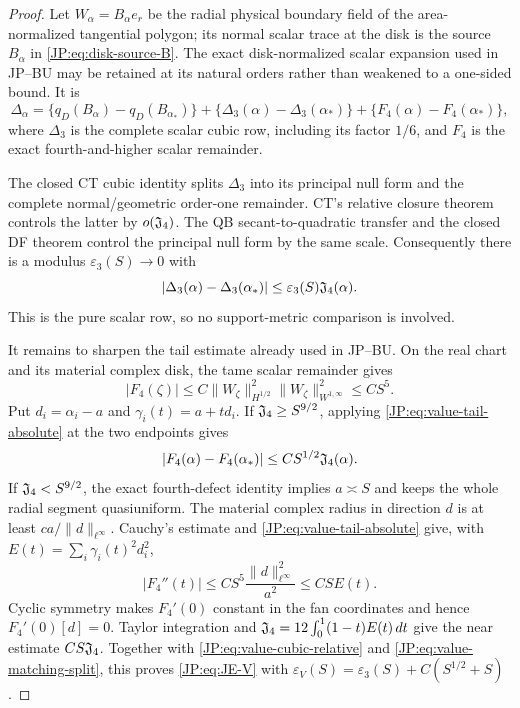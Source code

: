 \begin{proof}
Let $W_\alpha=B_\alpha e_r$ be the radial physical boundary field of the
area-normalized tangential polygon; its normal scalar trace at the disk is
the source $B_\alpha$ in \eqref{JP:eq:disk-source-B}.  The exact
disk-normalized scalar expansion used in JP--BU may be retained
at its natural orders rather than weakened to a one-sided bound.  It is
\begin{equation}\label{JP:eq:value-matching-split}
 \Delta_\alpha
 =\{q_D(B_\alpha)-q_D(B_{\alpha_*})\}
  +\{\Delta_3(\alpha)-\Delta_3(\alpha_*)\}
  +\{F_4(\alpha)-F_4(\alpha_*)\},
\end{equation}
where $\Delta_3$ is the complete scalar cubic row, including its factor
$1/6$, and $F_4$ is the exact fourth-and-higher scalar remainder.

The closed CT cubic identity splits $\Delta_3$ into its principal null form
and the complete normal/geometric order-one remainder.  CT's relative
closure theorem controls the latter by $o(\mathfrak J_4)$.  The QB
secant-to-quadratic transfer and the closed DF theorem control the principal
null form by the same scale.  Consequently there is a modulus
$\varepsilon_3(S)\to0$ with
\begin{equation}\label{JP:eq:value-cubic-relative}
 |\Delta_3(\alpha)-\Delta_3(\alpha_*)|
 \le\varepsilon_3(S)\mathfrak J_4(\alpha).
\end{equation}
This is the pure scalar row, so no support-metric comparison is involved.

It remains to sharpen the tail estimate already used in JP--BU.  On the
real chart and its material complex disk, the tame scalar remainder gives
\begin{equation}\label{JP:eq:value-tail-absolute}
 |F_4(\zeta)|
 \le C\|W_\zeta\|_{H^{1/2}}^2
       \|W_\zeta\|_{W^{1,\infty}}^2
 \le CS^5.
\end{equation}
Put $d_i=\alpha_i-a$ and $\gamma_i(t)=a+td_i$.  If
$\mathfrak J_4\ge S^{9/2}$, applying \eqref{JP:eq:value-tail-absolute} at the two
endpoints gives
\[
 |F_4(\alpha)-F_4(\alpha_*)|
 \le CS^{1/2}\mathfrak J_4(\alpha).
\]
If $\mathfrak J_4<S^{9/2}$, the exact fourth-defect identity implies
$a\asymp S$ and keeps the whole radial segment quasiuniform.  The material
complex radius in direction $d$ is at least
$ca/\|d\|_{\ell^\infty}$.  Cauchy's estimate and
\eqref{JP:eq:value-tail-absolute} give, with
$E(t)=\sum_i\gamma_i(t)^2d_i^2$,
\[
 |F_4''(t)|
 \le CS^5\frac{\|d\|_{\ell^\infty}^2}{a^2}
 \le CS E(t).
\]
Cyclic symmetry makes $F_4'(0)$ constant in the fan coordinates and hence
$F_4'(0)[d]=0$.  Taylor integration and
$\mathfrak J_4=12\int_0^1(1-t)E(t)\,dt$ give the near estimate
$CS\mathfrak J_4$.  Together with \eqref{JP:eq:value-cubic-relative} and
\eqref{JP:eq:value-matching-split}, this proves \eqref{JP:eq:JE-V} with
$\varepsilon_V(S)=\varepsilon_3(S)+C(S^{1/2}+S)$.
\end{proof}

